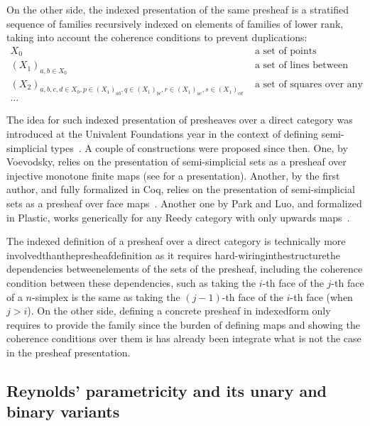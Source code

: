 \documentclass{msc}
\begin{document}
On the other side, the indexed presentation of the same presheaf is a stratified sequence of families recursively indexed on elements of families of lower rank, taking into account the coherence conditions to prevent duplications:
\begin{align*}
  X_0                                                                                      & \mbox{ a set of points}                                       \\
  (X_1)_{a,b\in X_0}                                                                       & \mbox{ a set of lines between any two points}                 \\
  (X_2)_{a,b,c,d\in X_0,p\in (X_1)_{ab},q\in (X_1)_{bc},r \in (X_1)_{ac}, s\in (X_1)_{cd}} & \mbox{ a set of squares over any 4 lines lying over 4 points} \\
  \ldots
\end{align*}

The idea for such indexed presentation of presheaves over a direct category was introduced at the Univalent Foundations year in the context of defining semi-simplicial types~\cite{...}. A couple of constructions were proposed since then. One, by Voevodsky, relies on the presentation of semi-simplicial sets as a presheaf over injective monotone finite maps (see \cite[Section]{Herbelin14} for a presentation). Another, by the first author, and fully formalized in Coq, relies on the presentation of semi-simplicial sets as a presheaf over face maps~\cite{Herbelin14}. Another one by Park and Luo, and formalized in Plastic, works generically for any Reedy category with only upwards maps~\cite{ParkLuo}.

The indexed definition of a presheaf over a direct category is technically more involvedthanthepresheafdefinition as it requires hard-wiringinthestructurethe dependencies betweenelements of the sets of the presheaf, including the coherence condition between these dependencies, such as taking the $i$-th face of the $j$-th face of a $n$-simplex is the same as taking the $(j-1)$-th face of the $i$-th face (when $j>i$). On the other side, defining a concrete presheaf in indexedform only requires to provide the family since the burden of defining maps and showing the coherence conditions over them is has already been integrate what is not the case in the presheaf presentation.

\subsection{Reynolds' parametricity and its unary and binary variants}
\end{document}
